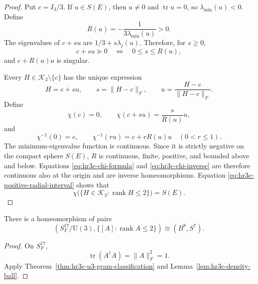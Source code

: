 \begin{proof}
Put \(c=I_3/3\).  If \(u\in S(E)\), then \(u\ne0\) and
\(\operatorname{tr}u=0\), so
\(\lambda_{\min}(u)<0\).  Define
\begin{equation}
 R(u)=-\frac{1}{3\lambda_{\min}(u)}>0.
 \label{eq:hr3c-radial-length}
\end{equation}
The eigenvalues of \(c+s u\) are
\(1/3+s\lambda_j(u)\).  Therefore, for \(s\geq0\),
\begin{equation}
 c+s u\succeq0
 \quad\Longleftrightarrow\quad
 0\leq s\leq R(u),
 \label{eq:hr3c-positive-radial-interval}
\end{equation}
and \(c+R(u)u\) is singular.

Every \(H\in\mathcal K_3\setminus\{c\}\) has the unique expression
\[
 H=c+s u,
 \qquad
 s=\lVert H-c\rVert_F,
 \qquad
 u=\frac{H-c}{\lVert H-c\rVert_F}.
\]
Define
\begin{equation}
 \chi(c)=0,
 \qquad
 \chi(c+s u)=\frac{s}{R(u)}u,
 \label{eq:hr3c-chi-formula}
\end{equation}
and
\begin{equation}
 \chi^{-1}(0)=c,
 \qquad
 \chi^{-1}(r u)=c+rR(u)u
 \quad(0<r\leq1).
 \label{eq:hr3c-chi-inverse}
\end{equation}
The minimum-eigenvalue function is continuous.  Since it is strictly
negative on the compact sphere \(S(E)\), \(R\) is continuous, finite,
positive, and bounded above and below.  Equations
\eqref{eq:hr3c-chi-formula} and \eqref{eq:hr3c-chi-inverse} are therefore
continuous also at the origin and are inverse homeomorphisms.
Equation \eqref{eq:hr3c-positive-radial-interval} shows that
\[
 \chi\bigl(\{H\in\mathcal K_3:\operatorname{rank}H\leq2\}\bigr)
 =S(E).
\]
\end{proof}

\begin{corollary}
\label{cor:hr3c-u3-unit-quotient}
There is a homeomorphism of pairs
\begin{equation}
 \left(
 S^{17}_F/\mathrm U(3),
 \{[A]:\operatorname{rank}A\leq2\}
 \right)
 \cong
 (B^8,S^7).
 \label{eq:hr3c-u3-unit-pair}
\end{equation}
\end{corollary}

\begin{proof}
On \(S^{17}_F\),
\[
 \operatorname{tr}(A^\dagger A)=\lVert A\rVert_F^2=1.
\]
Apply Theorem~\ref{thm:hr3c-u3-gram-classification} and
Lemma~\ref{lem:hr3c-density-ball}.
\end{proof}

